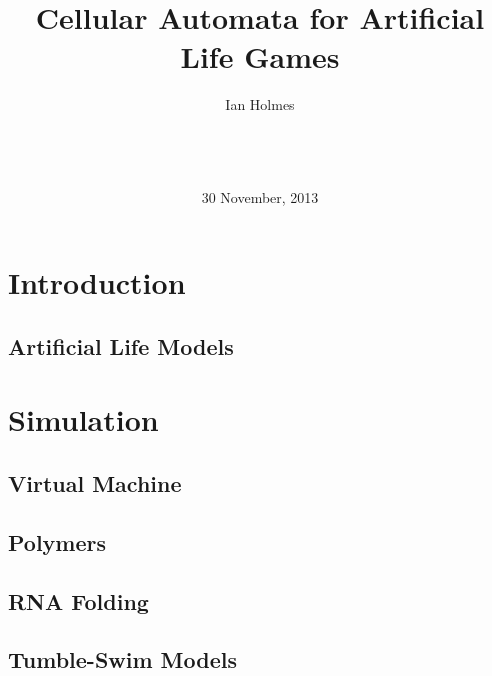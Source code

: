 \documentclass{acm_proc_article-sp}
\begin{document}
\title{Cellular Automata for Artificial Life Games}
\author{
\alignauthor
Ian Holmes\\
       \\
       \\
       \\
}
\date{30 November, 2013}

\maketitle
\begin{abstract}
\end{abstract}



\section{Introduction}

\subsection{Artificial Life Models}

\section{Simulation}

\subsection{Virtual Machine}

\subsection{Polymers}

\subsection{RNA Folding}

\subsection{Tumble-Swim Models}
\end{document}
